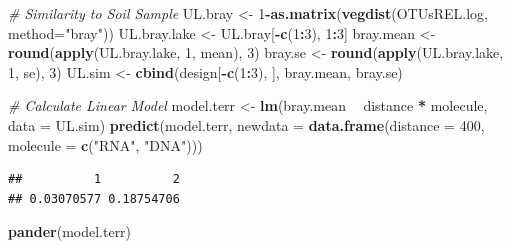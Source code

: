 \documentclass[]{article}
\newenvironment{Shaded}{\begin{snugshade}}{\end{snugshade}}
\newcommand{\KeywordTok}[1]{\textcolor[rgb]{0.13,0.29,0.53}{\textbf{#1}}}
\newcommand{\DataTypeTok}[1]{\textcolor[rgb]{0.13,0.29,0.53}{#1}}
\newcommand{\DecValTok}[1]{\textcolor[rgb]{0.00,0.00,0.81}{#1}}
\newcommand{\StringTok}[1]{\textcolor[rgb]{0.31,0.60,0.02}{#1}}
\newcommand{\CommentTok}[1]{\textcolor[rgb]{0.56,0.35,0.01}{\textit{#1}}}
\newcommand{\OperatorTok}[1]{\textcolor[rgb]{0.81,0.36,0.00}{\textbf{#1}}}
\newcommand{\NormalTok}[1]{#1}
\begin{document}
\begin{Shaded}
\begin{Highlighting}[]
\CommentTok{# Similarity to Soil Sample}
\NormalTok{UL.bray      <-}\StringTok{ }\DecValTok{1}\OperatorTok{-}\KeywordTok{as.matrix}\NormalTok{(}\KeywordTok{vegdist}\NormalTok{(OTUsREL.log, }\DataTypeTok{method=}\StringTok{"bray"}\NormalTok{))}
\NormalTok{UL.bray.lake <-}\StringTok{ }\NormalTok{UL.bray[}\OperatorTok{-}\KeywordTok{c}\NormalTok{(}\DecValTok{1}\OperatorTok{:}\DecValTok{3}\NormalTok{), }\DecValTok{1}\OperatorTok{:}\DecValTok{3}\NormalTok{] }
\NormalTok{bray.mean    <-}\StringTok{ }\KeywordTok{round}\NormalTok{(}\KeywordTok{apply}\NormalTok{(UL.bray.lake, }\DecValTok{1}\NormalTok{, mean), }\DecValTok{3}\NormalTok{)}
\NormalTok{bray.se      <-}\StringTok{ }\KeywordTok{round}\NormalTok{(}\KeywordTok{apply}\NormalTok{(UL.bray.lake, }\DecValTok{1}\NormalTok{, se), }\DecValTok{3}\NormalTok{)}
\NormalTok{UL.sim       <-}\StringTok{ }\KeywordTok{cbind}\NormalTok{(design[}\OperatorTok{-}\KeywordTok{c}\NormalTok{(}\DecValTok{1}\OperatorTok{:}\DecValTok{3}\NormalTok{), ], bray.mean, bray.se)}

\CommentTok{# Calculate Linear Model}
\NormalTok{model.terr <-}\StringTok{ }\KeywordTok{lm}\NormalTok{(bray.mean }\OperatorTok{~}\StringTok{ }\NormalTok{distance }\OperatorTok{*}\StringTok{ }\NormalTok{molecule, }\DataTypeTok{data =}\NormalTok{ UL.sim)}
\KeywordTok{predict}\NormalTok{(model.terr, }\DataTypeTok{newdata =} \KeywordTok{data.frame}\NormalTok{(}\DataTypeTok{distance =} \DecValTok{400}\NormalTok{, }\DataTypeTok{molecule =} \KeywordTok{c}\NormalTok{(}\StringTok{"RNA"}\NormalTok{, }\StringTok{"DNA"}\NormalTok{)))}
\end{Highlighting}
\end{Shaded}

\begin{verbatim}
##          1          2 
## 0.03070577 0.18754706
\end{verbatim}

\begin{Shaded}
\begin{Highlighting}[]
\KeywordTok{pander}\NormalTok{(model.terr)}
\end{Highlighting}
\end{Shaded}
\end{document}

